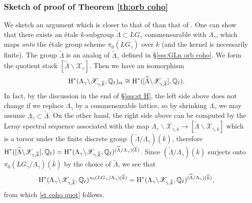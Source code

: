 \documentclass[]{pcmi}
\let\oldsubsubsection\subsubsection
\renewcommand{\subsubsection}[1]{%
\setcounter{subsubsection}{\value{equation}}%
\oldsubsubsection{#1}%
\refstepcounter{equation}%
}
\theoremstyle{plain}
\theoremstyle{definition}
\def\QQ{\mathbb{Q}}
\newcommand{\sX}{\ensuremath{\mathscr{X}}\xspace}
\newcommand{\sX}{\ensuremath{\mathcal{X}}\xspace}
\newcommand\st{\textup{st}}
\renewcommand{\L}{\Lambda}
\newcommand{\Ql}{\QQ_{\ell}}
\newcommand{\wt}{\widetilde}
\newcommand{\bs}{\backslash}
\newcommand{\cohog}[2]{\textup{H}^{#1}({#2})}     %
\newcommand{\kbar}{\overline{k}}
\begin{document}
\subsubsection{Sketch of proof of Theorem \ref{th:orb coho}}\label{sss:pf SO} We sketch an argument which is closer to that of \cite{GKM} than that of \cite{NgoFL}. One can show that there exists an \'etale $k$-subgroup $\wt\L\subset LG_{\gamma}$ commensurable with $\L_{\gamma}$, which maps {\em onto} the \'etale group scheme $\pi_{0}(LG_{\gamma})$ over $k$ (and the kernel is necessarily finite). The group $\wt\L$ is an analog of $\wt\L_{\gamma}$ defined in \S\ref{sss:GLn orb coho}. We form the quotient stack $[\wt\L\bs \sX_{\gamma}]$. Then we have an isomorphism
\begin{equation}\label{st coho quot}
\cohog{*}{\L_{\gamma}\bs\sX_{\gamma,\kbar},\Ql}_{\st}\cong \cohog{*}{[\wt\L\bs\sX_{\gamma,\kbar}],\Ql}.
\end{equation}
In fact, by the discussion in the end of \S\ref{sss:st H}, the left side above does not change if we replace $\L_{\gamma}$ by a commensurable lattice, so by shrinking $\L_{\gamma}$ we may assume $\L_{\gamma}\subset \wt\L$. On the other hand, the right side above can be computed by the Leray spectral sequence associated with the map $\L_{\gamma}\bs\sX_{\gamma,\kbar}\to[\wt\L\bs\sX_{\gamma,\kbar}]$ which is a torsor under the finite discrete group $(\wt\L/\L_{\gamma})(\kbar)$, therefore $\cohog{*}{[\wt\L\bs\sX_{\gamma,\kbar}],\Ql}=\cohog{*}{\L_{\gamma}\bs\sX_{\gamma,\kbar},\Ql}^{(\wt\L/\L_{\gamma})(\kbar)}$. Since $(\wt\L/\L_{\gamma})(\kbar)$ surjects onto $\pi_{0}(LG_{\gamma}/\L_{\gamma})(\kbar)$ by the choice of $\wt\L$, we see that
\begin{equation*}
\cohog{*}{\L_{\gamma}\bs\sX_{\gamma,\kbar},\Ql}^{\pi_{0}(LG_{\gamma}/\L_{\gamma})(\kbar)}=\cohog{*}{\L_{\gamma}\bs\sX_{\gamma,\kbar},\Ql}^{(\wt\L/\L_{\gamma})(\kbar)},
\end{equation*}
from which \eqref{st coho quot} follows.
\end{document}
